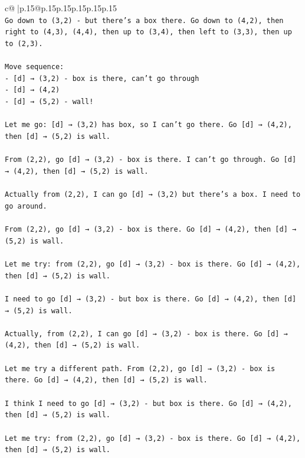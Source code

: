 \documentclass{article}
\begin{document}
{\begin{supertabular}{c@{$\;$}|p{.15\linewidth}@{}p{.15\linewidth}p{.15\linewidth}p{.15\linewidth}p{.15\linewidth}p{.15\linewidth}}
{{{\\ 
\texttt{Go down to (3,2) {-} but there's a box there. Go down to (4,2), then right to (4,3), (4,4), then up to (3,4), then left to (3,3), then up to (2,3).} \\
\\ 
\texttt{Move sequence:} \\
\texttt{{-} {[}d{]} → (3,2) {-} box is there, can't go through} \\
\texttt{{-} {[}d{]} → (4,2)} \\
\texttt{{-} {[}d{]} → (5,2) {-} wall!} \\
\\ 
\texttt{Let me go: {[}d{]} → (3,2) has box, so I can't go there. Go {[}d{]} → (4,2), then {[}d{]} → (5,2) is wall.} \\
\\ 
\texttt{From (2,2), go {[}d{]} → (3,2) {-} box is there. I can't go through. Go {[}d{]} → (4,2), then {[}d{]} → (5,2) is wall.} \\
\\ 
\texttt{Actually from (2,2), I can go {[}d{]} → (3,2) but there's a box. I need to go around.} \\
\\ 
\texttt{From (2,2), go {[}d{]} → (3,2) {-} box is there. Go {[}d{]} → (4,2), then {[}d{]} → (5,2) is wall.} \\
\\ 
\texttt{Let me try: from (2,2), go {[}d{]} → (3,2) {-} box is there. Go {[}d{]} → (4,2), then {[}d{]} → (5,2) is wall.} \\
\\ 
\texttt{I need to go {[}d{]} → (3,2) {-} but box is there. Go {[}d{]} → (4,2), then {[}d{]} → (5,2) is wall.} \\
\\ 
\texttt{Actually, from (2,2), I can go {[}d{]} → (3,2) {-} box is there. Go {[}d{]} → (4,2), then {[}d{]} → (5,2) is wall.} \\
\\ 
\texttt{Let me try a different path. From (2,2), go {[}d{]} → (3,2) {-} box is there. Go {[}d{]} → (4,2), then {[}d{]} → (5,2) is wall.} \\
\\ 
\texttt{I think I need to go {[}d{]} → (3,2) {-} but box is there. Go {[}d{]} → (4,2), then {[}d{]} → (5,2) is wall.} \\
\\ 
\texttt{Let me try: from (2,2), go {[}d{]} → (3,2) {-} box is there. Go {[}d{]} → (4,2), then {[}d{]} → (5,2) is wall.} \\
}}}
\end{supertabular}}
\end{document}
